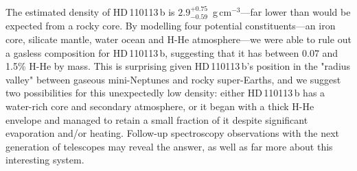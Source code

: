 \documentclass[fleqn,usenatbib]{mnras}
\newcommand{\gcm}{g\,cm$^{-3}$}	%
\newcommand{\Trhopgcmthree}{ $ 2.9^{+0.75}_{-0.59} $ }
\newcommand{\Tplanet}{HD\,110113\,b}
\begin{document}
The estimated density of \Tplanet{} is \Trhopgcmthree{}\,\gcm{}---far lower than would be expected from a rocky core.
By modelling four potential constituents---an iron core, silicate mantle, water ocean and H-He atmosphere---we were able to rule out a gasless composition for \Tplanet{}, suggesting that it has between 0.07 and 1.5\% H-He by mass.
This is surprising given \Tplanet{}'s position in the "radius valley" between gaseous mini-Neptunes and rocky super-Earths, and we suggest two possibilities for this unexpectedly low density: either \Tplanet{} has a water-rich core and secondary atmosphere, or it began with a thick H-He envelope and managed to retain a small fraction of it despite significant evaporation and/or heating.
Follow-up spectroscopy observations with the next generation of telescopes may reveal the answer, as well as far more about this interesting system.


\end{document}
